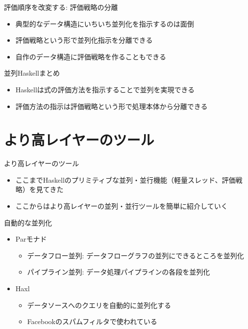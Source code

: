 \documentclass[unicode,12pt]{beamer}
\begin{document}
\begin{frame}{評価順序を改変する: 評価戦略の分離}
  \begin{itemize}
    \item 典型的なデータ構造にいちいち並列化を指示するのは面倒
    \item \alert{評価戦略}という形で並列化指示を分離できる
    \item 自作のデータ構造に評価戦略を作ることもできる
    \end{itemize}
  
\end{frame}

\begin{frame}{並列Haskellまとめ}
  \begin{itemize}
  \item Haskellは式の評価方法を指示することで並列を実現できる
  \item 評価方法の指示は評価戦略という形で処理本体から分離できる
  \end{itemize}
\end{frame}

\section{より高レイヤーのツール}

\begin{frame}{より高レイヤーのツール}
  \begin{itemize}
    \item ここまでHaskellのプリミティブな並列・並行機能（軽量スレッド、評価戦略）を見てきた
    \item ここからはより高レイヤーの並列・並行ツールを簡単に紹介していく
  \end{itemize}
\end{frame}

\begin{frame}{自動的な並列化}
  \begin{itemize}
  \item Parモナド
    \begin{itemize}
    \item データフロー並列: データフローグラフの並列にできるところを並列化
    \item パイプライン並列: データ処理パイプラインの各段を並列化
    \end{itemize}
  \item Haxl
    \begin{itemize}
    \item データソースへのクエリを自動的に並列化する
    \item Facebookのスパムフィルタで使われている
    \end{itemize}
  \end{itemize}
\end{frame}
\end{document}
